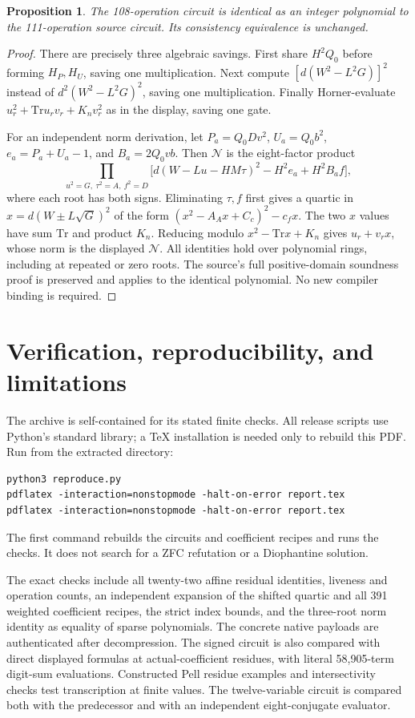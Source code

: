 \documentclass[11pt]{article}
\newtheorem{proposition}[theorem]{Proposition}
\theoremstyle{remark}\newtheorem{remark}[theorem]{Remark}
\begin{document}
\begin{proposition}
The 108-operation circuit is identical as an integer polynomial to the
111-operation source circuit. Its consistency equivalence is unchanged.
\end{proposition}
\begin{proof}
There are precisely three algebraic savings. First share $H^2Q_0$ before
forming $H_P,H_U$, saving one multiplication. Next compute
$[d(W^2-L^2G)]^2$ instead of $d^2(W^2-L^2G)^2$, saving one multiplication.
Finally Horner-evaluate
$u_r^2+\mathrm{Tr}u_rv_r+K_nv_r^2$ as in the display, saving one gate.

For an independent norm derivation, let
$P_a=Q_0Dv^2$, $U_a=Q_0b^2$, $e_a=P_a+U_a-1$, and $B_a=2Q_0vb$.
Then $\mathcal N$ is the eight-factor product
\[
 \prod_{u^2=G,\ \tau^2=A,\ f^2=D}
 \bigl[d(W-Lu-HM\tau)^2-H^2e_a+H^2B_af\bigr],
\]
where each root has both signs. Eliminating $\tau,f$ first gives a quartic
in $x=d(W\pm L\sqrt G)^2$ of the form
$(x^2-A_Ax+C_c)^2-c_fx$. The two $x$ values have sum $\mathrm{Tr}$
and product $K_n$. Reducing modulo $x^2-\mathrm{Tr}x+K_n$ gives
$u_r+v_rx$, whose norm is the displayed $\mathcal N$.
All identities hold over polynomial rings, including at repeated or zero roots.
The source's full positive-domain soundness proof is preserved and applies
to the identical polynomial. No new compiler binding is required.
\end{proof}



\section{Verification, reproducibility, and limitations}\label{sec:verification}
The archive is self-contained for its stated finite checks. All release scripts
use Python's standard library; a TeX installation is needed only to rebuild
this PDF. Run from the extracted directory:
\begin{lstlisting}
python3 reproduce.py
pdflatex -interaction=nonstopmode -halt-on-error report.tex
pdflatex -interaction=nonstopmode -halt-on-error report.tex
\end{lstlisting}
The first command rebuilds the circuits and coefficient recipes and runs the
checks. It does not search for a ZFC refutation or a Diophantine solution.

The exact checks include all twenty-two affine residual identities, liveness
and operation counts, an independent expansion of the shifted quartic and all
391 weighted coefficient recipes, the strict index bounds, and the three-root
norm identity as equality of sparse polynomials. The concrete native payloads
are authenticated after decompression. The signed circuit is also compared
with direct displayed formulas at actual-coefficient residues, with literal
58,905-term digit-sum evaluations. Constructed Pell residue examples and
intersectivity checks test transcription at finite values. The twelve-variable
circuit is compared both with the predecessor and with an independent
eight-conjugate evaluator.
\end{document}
